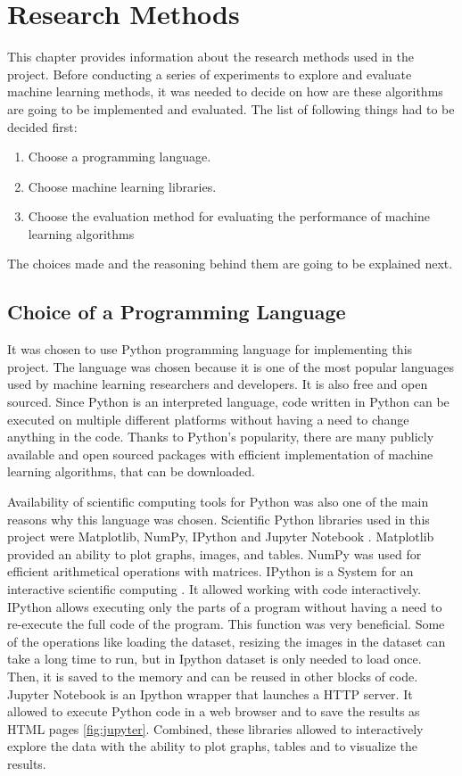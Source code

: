 \chapter{Research Methods}

This chapter provides information about the research methods used in the project. Before conducting a series of experiments to explore and evaluate machine learning methods, it was needed to decide on how are these algorithms are going to be implemented and evaluated. The list of following things had to be decided first: \begin{enumerate}
  \item Choose a programming language.
  \item Choose machine learning libraries.
  \item Choose the evaluation method for evaluating the performance of machine learning algorithms
\end{enumerate}The choices made and the reasoning behind them are going to be explained next.

\section{Choice of a Programming Language}

 It was chosen to use Python programming language for implementing this project. The language was chosen because it is one of the most popular languages used by machine learning researchers and developers. It is also free and open sourced. Since Python is an interpreted language, code written in Python can be executed on multiple different platforms without having a need to change anything in the code. Thanks to Python's popularity, there are many publicly available and open sourced packages with efficient implementation of machine learning algorithms, that can be downloaded.

Availability of scientific computing tools for Python was also one of the main reasons why this language was chosen. Scientific Python libraries used in this project were Matplotlib, NumPy, IPython and Jupyter Notebook \citep{scipy}. Matplotlib provided an ability to plot graphs, images, and tables. NumPy was used for efficient arithmetical operations with matrices. IPython is a System for an interactive scientific computing \citep{ipython}. It allowed working with code interactively. IPython allows executing only the parts of a program without having a need to re-execute the full code of the program. This function was very beneficial. Some of the operations like loading the dataset, resizing the images in the dataset can take a long time to run, but in Ipython dataset is only needed to load once. Then, it is saved to the memory and can be reused in other blocks of code. Jupyter Notebook is an Ipython wrapper that launches a HTTP server. It allowed to execute Python code in a web browser and to save the results as HTML pages \autoref{fig:jupyter}. Combined, these libraries allowed to interactively explore the data with the ability to plot graphs, tables and to visualize the results.

